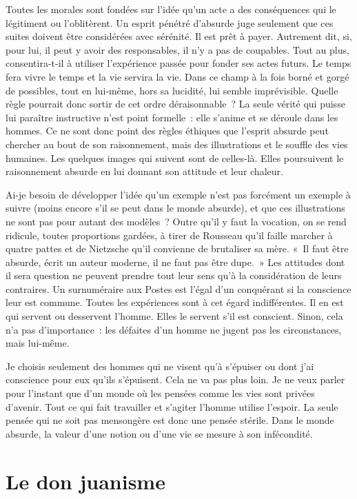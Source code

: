 \documentclass{book}
\begin{document}
Toutes les morales sont fondées sur l'idée qu'un acte a des conséquences qui le légitiment ou l'oblitèrent. Un esprit pénétré d'absurde juge seulement que ces suites doivent être considérées avec sérénité. Il est prêt à payer. Autrement dit, si, pour lui, il peut y avoir des responsables, il n'y a pas de coupables. Tout au plus, consentira-t-il à utiliser l'expérience passée pour fonder ses actes futurs. Le temps fera vivre le temps et la vie servira la vie. Dans ce champ à la fois borné et gorgé de possibles, tout en lui‑même, hors sa lucidité, lui semble imprévisible. Quelle règle pourrait donc sortir de cet ordre déraisonnable ? La seule vérité qui puisse lui paraître instructive n'est point formelle : elle s'anime et se déroule dans les hommes. Ce ne sont donc point des règles éthiques que l'esprit absurde peut chercher au bout de son raisonnement, mais des illustrations et le souffle des vies humaines. Les quelques images qui suivent sont de celles-là. Elles poursuivent le raisonnement absurde en lui donnant son attitude et leur chaleur.

Ai-je besoin de développer l'idée qu'un exemple n'est pas forcément un exemple à suivre (moins encore s'il se peut dans le monde absurde), et que ces illustrations ne sont pas pour autant des modèles ? Outre qu'il y faut la vocation, on se rend ridicule, toutes proportions gardées, à tirer de Rousseau qu'il faille marcher à quatre pattes et de Nietzsche qu'il convienne de brutaliser sa mère. « Il faut être absurde, écrit un auteur moderne, il ne faut pas être dupe. » Les attitudes dont il sera question ne peuvent prendre tout leur sens qu'à la considération de leurs contraires. Un surnuméraire aux Postes est l'égal d'un conquérant si la conscience leur est commune. Toutes les expériences sont à cet égard indifférentes. Il en est qui servent ou desservent l'homme. Elles le servent s'il est conscient. Sinon, cela n'a pas d'importance : les défaites d'un homme ne jugent pas les circonstances, mais lui-même.

Je choisis seulement des hommes qui ne visent qu'à s'épuiser ou dont j'ai conscience pour eux qu'ils s'épuisent. Cela ne va pas plus loin. Je ne veux parler pour l'instant que d'un monde où les pensées comme les vies sont privées d'avenir. Tout ce qui fait travailler et s'agiter l'homme utilise l'espoir. La seule pensée qui ne soit pas mensongère est donc une pensée stérile. Dans le monde absurde, la valeur d'une notion ou d'une vie se mesure à son infécondité.

\section{Le don juanisme}
\end{document}

